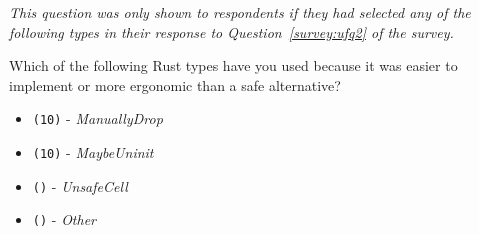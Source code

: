\noindent \textit{This question was only shown to respondents if they had selected any of the following types in their response to Question~\ref{survey:ufq2} of the survey.}
\begin{protocol}
\setcounter{protocoli}{1}
\item \label{survey:wueq2}  Which of the following Rust types have you used because it was easier to implement or more ergonomic than a safe alternative?
\begin{itemize}
\item \texttt{(10)} - \textit{ManuallyDrop}
\item \texttt{(10)} - \textit{MaybeUninit}
\item \texttt{()} - \textit{UnsafeCell}
\item \texttt{()} - \textit{Other}
\end{itemize}
\end{protocol}

